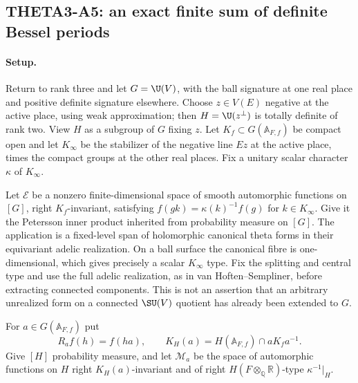 \documentclass[11pt]{article}
\newcommand{\Q}{\mathbb Q}\newcommand{\C}{\mathbb C}\newcommand{\Z}{\mathbb Z}\newcommand{\R}{\mathbb R}\newcommand{\A}{\mathbb A}\newcommand{\OO}{\mathcal O}
\theoremstyle{definition}\newtheorem{definition}[theorem]{Definition}\newtheorem{remark}[theorem]{Remark}
\begin{document}
\subsection{THETA3-A5: an exact finite sum of definite Bessel periods}\label{A5}

\paragraph{Setup.}
Return to rank three and let $G=\U(V)$, with the ball signature at one
real place and positive definite signature elsewhere. Choose
$z\in V(E)$ negative at the active place, using weak approximation;
then $H=\U(z^\perp)$ is totally definite of rank two. View $H$ as a
subgroup of $G$ fixing $z$. Let $K_f\subset G(\A_{F,f})$ be compact
open and let $K_\infty$ be the stabilizer of the negative line $Ez$ at
the active place, times the compact groups at the other real places.
Fix a unitary scalar character $\kappa$ of $K_\infty$.

Let $\mathcal E$ be a nonzero finite-dimensional space of smooth
automorphic functions on $[G]$, right $K_f$-invariant, satisfying
$f(gk)=\kappa(k)^{-1}f(g)$ for $k\in K_\infty$. Give it the
Petersson inner product inherited from probability measure on $[G]$.
The application is a fixed-level span of holomorphic canonical theta
forms in their equivariant adelic realization. On a ball surface the
canonical fibre is one-dimensional, which gives precisely a scalar
$K_\infty$ type. Fix the splitting and central type and use the full
adelic realization, as in van Hoften--Sempliner, before extracting
connected components. This is not an assertion that an arbitrary
unrealized form on a connected $\SU(V)$ quotient has already been
extended to $G$.

For $a\in G(\A_{F,f})$ put
\[
 R_af(h)=f(ha),\qquad
 K_H(a)=H(\A_{F,f})\cap aK_fa^{-1}.
\]
Give $[H]$ probability measure, and let $\mathcal M_a$ be the space of
automorphic functions on $H$ right $K_H(a)$-invariant and of right
$H(F\otimes_\Q\R)$-type $\kappa^{-1}|_H$.
\end{document}
